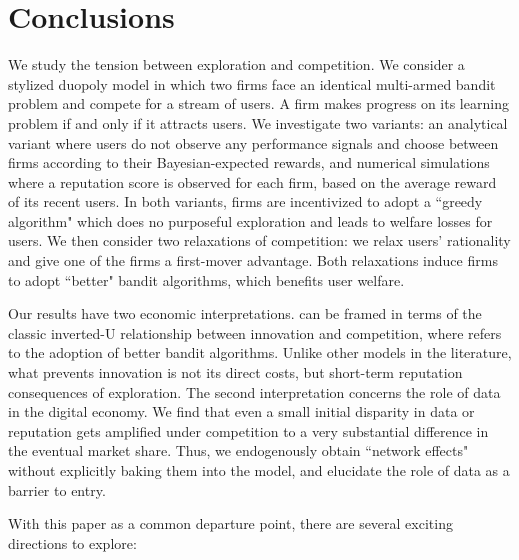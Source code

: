 \documentclass[../competing_bandits.tex]{subfiles}
\begin{document}
\section{Conclusions}\label{sec:conclusion}

We study the tension between exploration and competition. We consider a stylized duopoly model in which two firms face an identical multi-armed bandit problem and compete for a stream of users. A firm makes progress on its learning problem if and only if it attracts users. We investigate two variants: an analytical variant where users do not observe any performance signals and choose between firms according to their Bayesian-expected rewards, and numerical simulations where a reputation score is observed for each firm, based on the average reward of its recent users.  In both variants, firms are incentivized to adopt a ``greedy algorithm" which does no purposeful exploration and leads to welfare losses for users. We then consider two relaxations of competition: we relax users' rationality and give one of the firms a first-mover advantage. Both relaxations induce firms to adopt ``better" bandit algorithms, which benefits user welfare.


Our results have two economic interpretations.  can be framed in terms of the classic inverted-U relationship between innovation and competition, where \innovation refers to the adoption of better bandit algorithms. Unlike other models in the literature, what prevents innovation is not its direct costs, but  short-term reputation consequences of exploration. The second interpretation concerns the role of data in the digital economy. We find that even a small initial disparity in data or reputation gets amplified under competition to a very substantial difference in the eventual market share. Thus, we endogenously obtain ``network effects" without explicitly baking them into the model, and elucidate the role of data as a barrier to entry.

With this paper as a common departure point, there are several exciting directions to explore:
\end{document}
